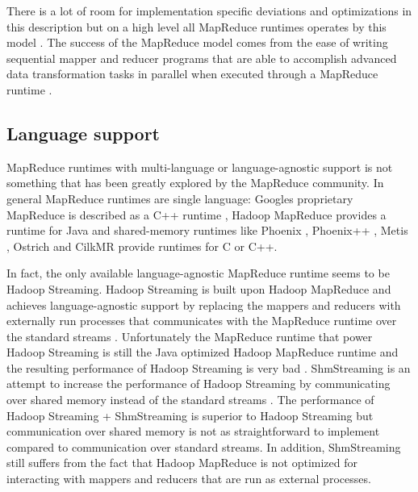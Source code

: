\documentclass[twocolumn,11px]{article}       %
\begin{document}
There is a lot of room for implementation specific deviations and optimizations
in this description but on a high level all MapReduce runtimes operates by this
model \cite{GoogleMapReduce} \cite{Hadoop} \cite{Phoenix} \cite{Phoenix++}
\cite{CilkMR} \cite{Metis} \cite{Ostrich}. The success of the MapReduce model
comes from the ease of writing sequential mapper and reducer programs that are
able to accomplish advanced data transformation tasks in parallel when executed
through a MapReduce runtime \cite{GoogleMapReduce}.

\subsection{Language support}

MapReduce runtimes with multi-language or language-agnostic support is not
something that has been greatly explored by the MapReduce community. In general
MapReduce runtimes are single language: Googles proprietary MapReduce is
described as a C++ runtime \cite{GoogleMapReduce}, Hadoop MapReduce provides a
runtime for Java \cite{Hadoop} and shared-memory runtimes like Phoenix
\cite{Phoenix}, Phoenix++ \cite{Phoenix++}, Metis \cite{Metis}, Ostrich
\cite{Ostrich} and CilkMR \cite{CilkMR} provide runtimes for C or C++.

In fact, the only available language-agnostic MapReduce runtime seems to be
Hadoop Streaming. Hadoop Streaming is built upon Hadoop MapReduce and achieves
language-agnostic support by replacing the mappers and reducers with externally
run processes that communicates with the MapReduce runtime over the standard
streams \cite{HadoopStreaming}. Unfortunately the MapReduce runtime that power
Hadoop Streaming is still the Java optimized Hadoop MapReduce runtime and the
resulting performance of Hadoop Streaming is very bad \cite{HadoopStreamingPerf}
\cite{Pydoop} \cite{Perldoop}. ShmStreaming is an attempt to increase the
performance of Hadoop Streaming by communicating over shared memory instead of
the standard streams \cite{ShmStreaming}. The performance of Hadoop Streaming +
ShmStreaming is superior to Hadoop Streaming but communication over shared
memory is not as straightforward to implement compared to communication over
standard streams. In addition, ShmStreaming still suffers from the fact that
Hadoop MapReduce is not optimized for interacting with mappers and reducers that
are run as external processes.
\end{document}

